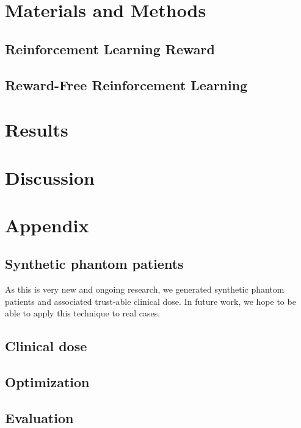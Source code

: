 \section{Materials and Methods}

\subsection{Reinforcement Learning Reward}

\subsection{Reward-Free Reinforcement Learning}


\section{Results}

\section{Discussion}



\section*{Appendix}

\subsection*{Synthetic phantom patients}
As this is very new and ongoing research, we generated synthetic phantom patients and associated trust-able clinical dose.
In future work, we hope to be able to apply this technique to real cases.

\subsection*{Clinical dose}

\subsection*{Optimization}

\subsection*{Evaluation}
